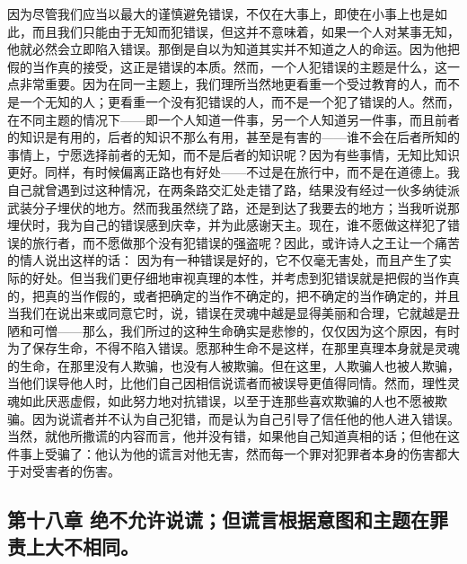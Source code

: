 因为尽管我们应当以最大的谨慎避免错误，不仅在大事上，即使在小事上也是如此，而且我们只能由于无知而犯错误，但这并不意味着，如果一个人对某事无知，他就必然会立即陷入错误。那倒是自以为知道其实并不知道之人的命运。因为他把假的当作真的接受，这正是错误的本质。然而，一个人犯错误的主题是什么，这一点非常重要。因为在同一主题上，我们理所当然地更看重一个受过教育的人，而不是一个无知的人；更看重一个没有犯错误的人，而不是一个犯了错误的人。然而，在不同主题的情况下——即一个人知道一件事，另一个人知道另一件事，而且前者的知识是有用的，后者的知识不那么有用，甚至是有害的——谁不会在后者所知的事情上，宁愿选择前者的无知，而不是后者的知识呢？因为有些事情，无知比知识更好。同样，有时候偏离正路也有好处——不过是在旅行中，而不是在道德上。我自己就曾遇到过这种情况，在两条路交汇处走错了路，结果没有经过一伙多纳徒派武装分子埋伏的地方。然而我虽然绕了路，还是到达了我要去的地方；当我听说那埋伏时，我为自己的错误感到庆幸，并为此感谢天主。现在，谁不愿做这样犯了错误的旅行者，而不愿做那个没有犯错误的强盗呢？因此，或许诗人之王让一个痛苦的情人说出这样的话： 因为有一种错误是好的，它不仅毫无害处，而且产生了实际的好处。但当我们更仔细地审视真理的本性，并考虑到犯错误就是把假的当作真的，把真的当作假的，或者把确定的当作不确定的，把不确定的当作确定的，并且当我们在说出来或同意它时，说，错误在灵魂中越是显得美丽和合理，它就越是丑陋和可憎——那么，我们所过的这种生命确实是悲惨的，仅仅因为这个原因，有时为了保存生命，不得不陷入错误。愿那种生命不是这样，在那里真理本身就是灵魂的生命，在那里没有人欺骗，也没有人被欺骗。但在这里，人欺骗人也被人欺骗，当他们误导他人时，比他们自己因相信说谎者而被误导更值得同情。然而，理性灵魂如此厌恶虚假，如此努力地对抗错误，以至于连那些喜欢欺骗的人也不愿被欺骗。因为说谎者并不认为自己犯错，而是认为自己引导了信任他的他人进入错误。当然，就他所撒谎的内容而言，他并没有错，如果他自己知道真相的话；但他在这件事上受骗了：他认为他的谎言对他无害，然而每一个罪对犯罪者本身的伤害都大于对受害者的伤害。\par


\subsection{第十八章 绝不允许说谎；但谎言根据意图和主题在罪责上大不相同。}

